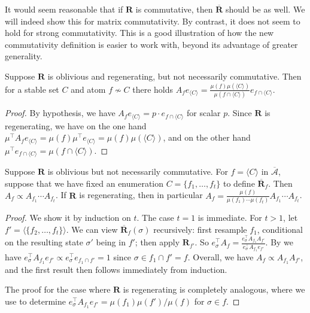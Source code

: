 \documentclass{toc}
\newcommand\oa{\overline{\mathcal A}}
\newcommand\obr{\overline{\mathbf R}}
\begin{document}
It would seem reasonable that if $\mathbf R$ is commutative, then $\obr$ should be as well.  We will indeed show this for matrix commutativity. By contrast, it does not seem to hold for strong commutativity. This is a good illustration of how the new commutativity definition is easier to work with, beyond its advantage of greater generality.

\begin{proposition}
\label{obl-p00}
Suppose $\mathbf R$ is oblivious and regenerating, but not necessarily commutative. Then for a stable set $C$ and atom $f \not \sim C$ there holds $A_f e_{\langle C \rangle} =\frac{\mu(f) \mu(\langle C \rangle)}{\mu(f \cap \langle C \rangle)} e_{f \cap \langle C \rangle}$.
\end{proposition}
\begin{proof}
By hypothesis, we have $A_f e_{\langle C \rangle} = p \cdot e_{f \cap \langle C \rangle}$ for scalar $p$. Since $\mathbf R$ is regenerating, we have on the one hand $\mu^{\top} A_f e_{\langle C \rangle} = \mu(f) \mu^{\top} e_{\langle C \rangle} = \mu(f) \mu(\langle C \rangle)$, and on the other hand $\mu^{\top} e_{f \cap \langle C \rangle} = \mu(f \cap \langle C \rangle)$.
\end{proof}
  
\begin{proposition}
  \label{obl-p1}
  Suppose $\mathbf R$ is oblivious but not necessarily commutative. For $f = \langle C \rangle$ in $\oa$, suppose that we have fixed an enumeration $C = \{f_1, \dots, f_t \}$ to define $\obr_f$.    Then $
  A_f \propto A_{f_1} \cdots A_{f_t}$. If $\mathbf R$ is regenerating, then in particular $ A_f = \frac{\mu(f) }{\mu(f_1) \cdots \mu(f_t)}  A_{f_1} \cdots A_{f_t}$.
\end{proposition}
\begin{proof} We show it by induction on $t$. The case $t = 1$ is immediate.   For $t > 1$, let $f' = \langle \{ f_2, \dots, f_t \} \rangle$. We can view $\obr_f(\sigma)$ recursively:  first resample $f_1$, conditional on the resulting state $\sigma'$ being in $f'$; then apply $\mathbf R_{f'}$. So $ e_{\sigma}^{\top} A_f = \frac{ e_{\sigma}^{\top} A_{f_1} A_{f'} }{e_{\sigma}^{\top} A_{f_1} e_{f'}}$. By  we have $e_{\sigma}^{\top} A_{f_1} e_{f'} \propto e_{\sigma}^{\top} e_{f_1 \cap f'} = 1$ since $\sigma \in f_1 \cap f' = f$.  Overall, we have $A_f \propto A_{f_1} A_{f'}$, and the first result then follows immediately from induction.

The proof for the case where $\mathbf R$ is regenerating is completely analogous, where we use  to determine $e_{\sigma}^{\top} A_{f_1} e_{f'} = \mu(f_1) \mu(f') / \mu(f)$ for $\sigma \in f$.
\end{proof}
\end{document}
